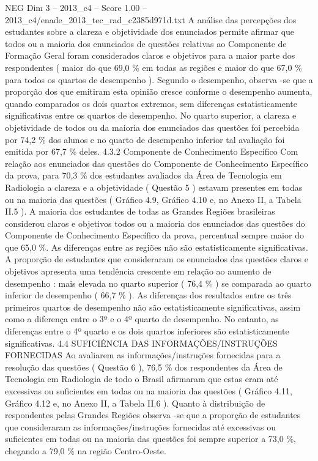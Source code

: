 \begin{textsample}{NEG Dim 3 – 2013\_c4 – Score 1.00 – 2013\_c4/enade\_2013\_tec\_rad\_c2385d971d.txt}
A análise das percepções dos estudantes sobre a clareza e objetividade dos enunciados permite afirmar que todos ou a maioria dos enunciados de questões relativas ao Componente de Formação Geral foram considerados claros e objetivos para a maior parte dos respondentes ( maior do que 69,0 \% em todas as regiões e maior do que 67,0 \% para todos os quartos de desempenho ).
Segundo o desempenho, observa -se que a proporção dos que emitiram esta opinião cresce conforme o desempenho aumenta, quando comparados os dois quartos extremos, sem diferenças estatisticamente significativas entre os quartos de desempenho.
No quarto superior, a clareza e objetividade de todos ou da maioria dos enunciados das questões foi percebida por 74,2 \% dos alunos e no quarto de desempenho inferior tal avaliação foi emitida por 67,7 \% deles. 4.3.2 Componente de Conhecimento Específico Com relação aos enunciados das questões do Componente de Conhecimento Específico da prova, para 70,3 \% dos estudantes avaliados da Área de Tecnologia em Radiologia a clareza e a objetividade ( Questão 5 ) estavam presentes em todas ou na maioria das questões ( Gráfico 4.9, Gráfico 4.10 e, no Anexo II, a Tabela II.5 ).
A maioria dos estudantes de todas as Grandes Regiões brasileiras considerou claros e objetivos todos ou a maioria dos enunciados das questões do Componente de Conhecimento Específico da prova, percentual sempre maior do que 65,0 \%.
As diferenças entre as regiões não são estatisticamente significativas.
A proporção de estudantes que consideraram os enunciados das questões claros e objetivos apresenta uma tendência crescente em relação ao aumento de desempenho : mais elevada no quarto superior ( 76,4 \% ) se comparada ao quarto inferior de desempenho ( 66,7 \% ).
As diferenças dos resultados entre os três primeiros quartos de desempenho não são estatisticamente significativas, assim como a diferença entre o 3º e o 4º quarto de desempenho.
No entanto, as diferenças entre o 4º quarto e os dois quartos inferiores são estatisticamente significativas. 4.4 SUFICIÊNCIA DAS INFORMAÇÕES/INSTRUÇÕES FORNECIDAS Ao avaliarem as informações/instruções fornecidas para a resolução das questões ( Questão 6 ), 76,5 \% dos respondentes da Área de Tecnologia em Radiologia de todo o Brasil afirmaram que estas eram até excessivas ou suficientes em todas ou na maioria das questões ( Gráfico 4.11, Gráfico 4.12 e, no Anexo II, a Tabela II.6 ).
Quanto à distribuição de respondentes pelas Grandes Regiões observa -se que a proporção de estudantes que consideraram as informações/instruções fornecidas até excessivas ou suficientes em todas ou na maioria das questões foi sempre superior a 73,0 \%, chegando a 79,0 \% na região Centro-Oeste.

\end{textsample}
